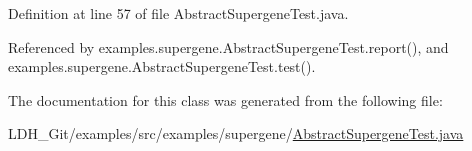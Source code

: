Definition at line 57 of file Abstract\-Supergene\-Test.\-java.



Referenced by examples.\-supergene.\-Abstract\-Supergene\-Test.\-report(), and examples.\-supergene.\-Abstract\-Supergene\-Test.\-test().



The documentation for this class was generated from the following file\-:\begin{DoxyCompactItemize}
\item 
L\-D\-H\-\_\-\-Git/examples/src/examples/supergene/\hyperlink{_abstract_supergene_test_8java}{Abstract\-Supergene\-Test.\-java}\end{DoxyCompactItemize}
